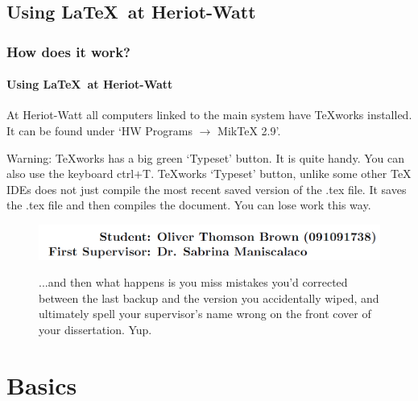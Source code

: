 \documentclass{beamer}
\begin{document}
\subsection[HWU]{Using \LaTeX\ at Heriot-Watt}
\begin{frame}
\frametitle{How does it work?}
\framesubtitle{Using \LaTeX\ at Heriot-Watt}
At Heriot-Watt all computers linked to the main system have TeXworks installed. It can be found under `HW Programs \(\rightarrow\) MikTeX 2.9'.
\vspace{\baselineskip}

\alert{Warning:} TeXworks has a big green `Typeset' button. It is quite handy. You can also use the keyboard ctrl\(+\)T. TeXworks `Typeset' button, unlike some other TeX IDEs does not just compile the most recent saved version of the .tex file. It \alert{saves} the .tex file and then compiles the document. \alert{You can lose work this way}.

\begin{figure}[!h]
\centering
\includegraphics[width=0.6\linewidth]{maniscalaco}
\label{fig:2}
\caption{...and then what happens is you miss mistakes you'd corrected between the last backup and the version you accidentally wiped, and ultimately spell your supervisor's name wrong on the front cover of your dissertation. Yup.}
\end{figure}
\end{frame}

\section{Basics}
\end{document}
